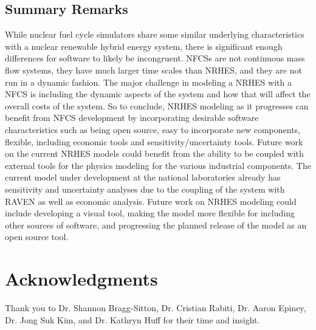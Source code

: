 \documentclass{article}                                                                           %
\begin{document}
\begin{linenumbers}
\section{Summary Remarks}
While nuclear fuel cycle simulators share some similar underlying characteristics with a nuclear renewable hybrid energy system, there is significant enough differences for software to likely be incongruent.  NFCSs are not continuous mass flow systems, they have much larger time scales than NRHES, and they are not run in a dynamic fashion. The major challenge in modeling a NRHES with a NFCS is including the dynamic aspects of the system and how that will affect the overall costs of the system. So to conclude, NRHES modeling as it progresses can benefit from NFCS development by incorporating desirable software characteristics such as being open source, easy to incorporate new components, flexible, including economic tools and sensitivity/uncertainty tools. Future work on the current NRHES models could benefit from the ability to be coupled with external tools for the physics modeling for the various industrial components. The current model under development at the national laboratories already has sensitivity and uncertainty analyses due to the coupling of the system with RAVEN as well as economic analysis. Future work on NRHES modeling could include developing a visual tool, making the model more flexible for including other sources of software, and progressing the planned release of the model as an open source tool.


\end{linenumbers}


\pagebreak
\section*{Acknowledgments}

Thank you to Dr. Shannon Bragg-Sitton, Dr. Cristian Rabiti, Dr. Aaron Epiney, Dr. Jong Suk Kim, and Dr. Kathryn Huff for their time and insight.

\pagebreak


\end{document}
